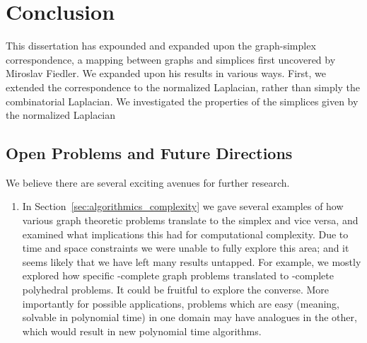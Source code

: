 \chapter{Conclusion}
\label{chap:conclusion}


This dissertation has expounded  and  expanded upon the graph-simplex correspondence, a mapping  between graphs and simplices  first uncovered by Miroslav Fiedler. 
We expanded upon his results in various ways. First, we extended the correspondence to the normalized Laplacian, rather than simply the combinatorial Laplacian. We investigated  the properties of the simplices given by the normalized Laplacian 


\section{Open Problems and Future Directions}
\label{sec:open_problems}

We believe there are several exciting  avenues for further  research. 
\begin{enumerate}
	\item In Section~\ref{sec:algorithmics_complexity} we gave several  examples of how various graph  theoretic problems translate to the simplex and vice  versa, and examined what implications this had for computational complexity. Due to time and space constraints we were unable to fully explore this area; and it seems likely that we have left many  results untapped.  For example, we mostly explored how specific \NP-complete graph problems translated to \NP-complete polyhedral problems. It could be fruitful to explore the converse. More importantly for possible applications, problems which are easy (meaning, solvable in polynomial time) in one domain may have analogues  in the other, which would result in new polynomial  time  algorithms. 
\end{enumerate}


